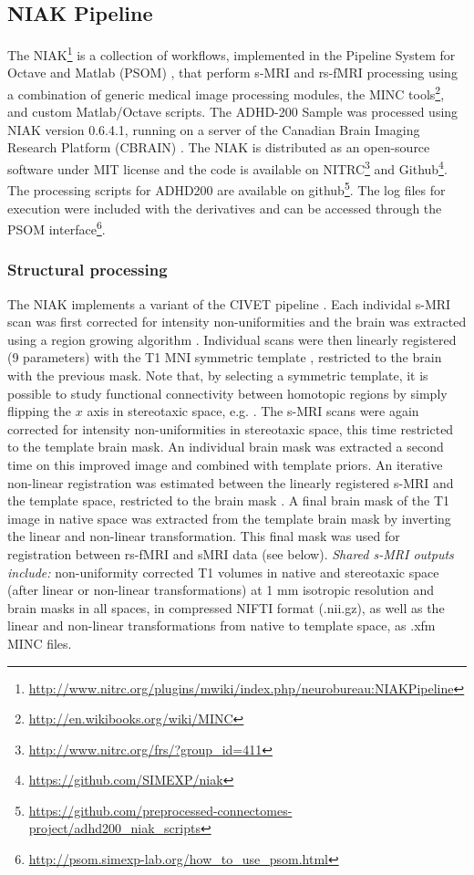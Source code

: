 \documentclass[preprint,12pt,3p]{elsarticle}
\begin{document}
\subsection{NIAK Pipeline}
The NIAK\footnote{\url{http://www.nitrc.org/plugins/mwiki/index.php/neurobureau:NIAKPipeline}} is a collection of workflows, implemented in the Pipeline System for Octave and Matlab (PSOM) \cite{Bellec2012}, that perform s-MRI and rs-fMRI processing using a combination of generic medical image processing modules, the MINC tools\footnote{\url{http://en.wikibooks.org/wiki/MINC}}, and custom Matlab/Octave scripts. The ADHD-200 Sample was processed using NIAK version 0.6.4.1, running on a server of the Canadian Brain Imaging Research Platform (CBRAIN) \cite{sherif2014cbrain}. The NIAK is distributed as an open-source software under MIT license and the code is available on NITRC\footnote{\url{http://www.nitrc.org/frs/?group_id=411}} and Github\footnote{\url{https://github.com/SIMEXP/niak}}. The processing scripts for ADHD200 are available on github\footnote{\url{https://github.com/preprocessed-connectomes-project/adhd200_niak_scripts}}. 
The log files for execution were included with the derivatives and can be accessed through the PSOM interface\footnote{\url{http://psom.simexp-lab.org/how_to_use_psom.html}}.

\subsubsection{Structural processing} The NIAK implements a variant of the CIVET pipeline \cite{ad2006civet}. Each individal s-MRI scan was first corrected for intensity non-uniformities \cite{sled1998nonparametric} and the brain was extracted using a region growing algorithm \cite{park2009skull}. Individual scans were then linearly registered (9 parameters) with the T1 MNI symmetric template \cite{fonov2011unbiased}, restricted to the brain with the previous mask. Note that, by selecting a symmetric template, it is possible to study functional connectivity between homotopic regions by simply flipping the $x$ axis in stereotaxic space, e.g. \cite{Zuo2010-ec}. The s-MRI scans were again corrected for intensity non-uniformities in stereotaxic space, this time restricted to the template brain mask. An individual brain mask was extracted a second time on this improved image \cite{park2009skull} and combined with template priors. An iterative non-linear registration was estimated between the linearly registered s-MRI and the template space, restricted to the brain mask \cite{collins1994automatic}. A final brain mask of the T1 image in native space was extracted from the template brain mask by inverting the linear and non-linear transformation. This final mask was used for registration between rs-fMRI and sMRI data (see below). \emph{Shared s-MRI outputs include:} non-uniformity corrected T1 volumes in native and stereotaxic space (after linear or non-linear transformations) at 1 mm isotropic resolution and brain masks in all spaces, in compressed NIFTI format (.nii.gz), as well as the linear and non-linear transformations from native to template space, as .xfm MINC files. 
\end{document}
